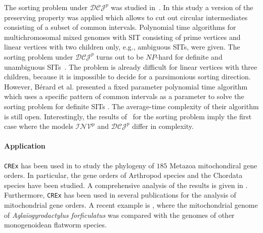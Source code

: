 \documentclass{svmult}
\newcommand{\m}[1]{\mathcal{#1}}
\begin{document}
The sorting problem under $\m{DCJ}^p$ was studied in~\cite{Berard_2008,Berard_2009}. In this study a version of the preserving
property was applied which allows to cut out circular intermediates 
consisting of a subset of common intervals.
%
Polynomial time algorithms for multichromosomal mixed
genomes with SIT consisting of prime vertices and linear vertices with two
children only, e.g., ambiguous SITs, were given.
%
The sorting problem under $\m{DCJ}^p$ turns out to be $NP$-hard for
definite and unambiguous SITs~\cite{Berard_2009}. The problem is already
difficult for linear vertices with three children, because it is
impossible to decide for a parsimonious sorting direction.
%
However, Bérard et al. presented a fixed parameter
polynomial time algorithm which uses a specific pattern of common
intervals as a parameter to solve the sorting problem for definite SITs
\cite{Berard_2009}.
The average-time complexity of their algorithm is still open.
%
Interestingly, the results of~\cite{Berard_2009} for the sorting
problem imply the first case where the models $\m{INV}^p$ and $\m{DCJ}^p$ differ
in complexity.

\paragraph{Application}
\texttt{CREx} has been used in \cite{Bernt_2011} to study the phylogeny
of $185$ Metazoa mitochondiral gene orders. In particular, the gene orders of 
Arthropod species and the Chordata species have been studied. A comprehensive analysis 
of the results is given in \cite{Bernt_2009}.
Furthermore, \texttt{CREx} has been used in several publications for the
analysis of mitochondrial gene orders. A recent example is
\cite{Bachmann_2016}, where the mitochondrial genome of
\emph{Aglaiogyrodactylus forficulatus} was compared with the genomes of other 
monogenoidean flatworm species.
\end{document}
